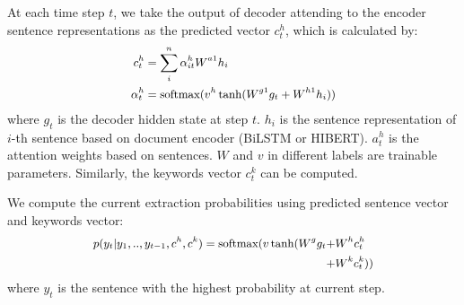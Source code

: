 At each time step $t$, we take the output of decoder attending to the encoder sentence representations 
as the predicted vector $c^h_t$, which is calculated by:
\begin{equation}
\small
\begin{aligned}
\small
c^h_t &= \sum_{i}^{n} {\alpha_{it}^h W^{a1} h_i} \\
\alpha_t^h &= \textup{softmax}(v^h \tanh(W^{g1} g_t + W^{h1} h_i)) \\ 
\end{aligned}
\end{equation}
where $g_t$ is the decoder hidden state at step $t$.
$h_i$ is the sentence representation of $i$-th sentence
based on document encoder (BiLSTM or HIBERT).
$a_t^h$ is the attention weights based on sentences.
$W$ and $v$ in different labels are trainable parameters.
Similarly, the keywords vector $c_t^k$ can be computed.

We compute the current extraction probabilities
using predicted sentence vector and keywords vector:
\begin{equation}
\small
\begin{aligned}
p(y_t|y_1,..,y_{t-1},c^h,c^k) = \textup{softmax}(v \tanh(W^{g} g_{t}  +& W^{h} c_t^h  \\
                                                     +& W^{k} c_t^k))
\end{aligned}
\end{equation}
where $y_t$ is the sentence with the highest probability at current step.

